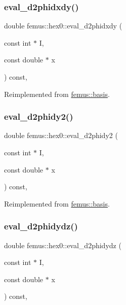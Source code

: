 \subsubsection{\texorpdfstring{eval\+\_\+d2phidxdy()}{eval\_d2phidxdy()}}
{\footnotesize\ttfamily double femus\+::hex0\+::eval\+\_\+d2phidxdy (\begin{DoxyParamCaption}\item[{const int $\ast$}]{I,  }\item[{const double $\ast$}]{x }\end{DoxyParamCaption}) const\hspace{0.3cm}{\ttfamily [inline]}, {\ttfamily [virtual]}}



Reimplemented from \mbox{\hyperlink{classfemus_1_1basis_ac9feaf9e60421143db2a3708f3c7fa48}{femus\+::basis}}.

\mbox{\label{classfemus_1_1hex0_a16cfc0e738c48d75e558479d4da76aa4}} 
\subsubsection{\texorpdfstring{eval\+\_\+d2phidy2()}{eval\_d2phidy2()}}
{\footnotesize\ttfamily double femus\+::hex0\+::eval\+\_\+d2phidy2 (\begin{DoxyParamCaption}\item[{const int $\ast$}]{I,  }\item[{const double $\ast$}]{x }\end{DoxyParamCaption}) const\hspace{0.3cm}{\ttfamily [inline]}, {\ttfamily [virtual]}}



Reimplemented from \mbox{\hyperlink{classfemus_1_1basis_a0febb29fe4b32213ff8d6d428f7241cd}{femus\+::basis}}.

\mbox{\label{classfemus_1_1hex0_a925359d6a2443d05fa45262a8a8da65c}} 
\subsubsection{\texorpdfstring{eval\+\_\+d2phidydz()}{eval\_d2phidydz()}}
{\footnotesize\ttfamily double femus\+::hex0\+::eval\+\_\+d2phidydz (\begin{DoxyParamCaption}\item[{const int $\ast$}]{I,  }\item[{const double $\ast$}]{x }\end{DoxyParamCaption}) const\hspace{0.3cm}{\ttfamily [inline]}, {\ttfamily [virtual]}}



